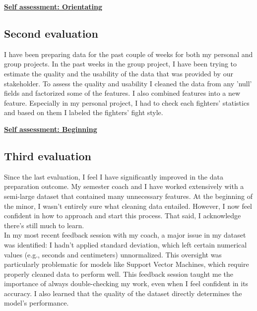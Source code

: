 \documentclass{article}
\begin{document}
	\underline{\textbf{Self assessment: Orientating}}
	
	\subsection{Second evaluation}
	I have been preparing data for the past couple of weeks for both my personal and group projects. In the past weeks in the group project, I have been 
	trying to estimate the quality and the usability of the data that was provided by our stakeholder. To assess the quality and usability I cleaned 
	the data from any 'null' fields and factorized some of the features. I also combined features into a new feature. Especially in my personal 
	project, I had to check each fighters' statistics and based on them I labeled the fighters' fight style.
	
	\underline{\textbf{Self assessment: Beginning}}
	
	\subsection{Third evaluation}
	Since the last evaluation, I feel I have significantly improved in the data preparation outcome. My semester coach and I have worked extensively with a semi-large dataset that contained many unnecessary features. At the beginning of the minor, I wasn’t entirely sure what cleaning data entailed. However, I now feel confident in how to approach and start this process. That said, I acknowledge there’s still much to learn.\\
	
	In my most recent feedback session with my coach, a major issue in my dataset was identified: I hadn’t applied standard deviation, which left certain numerical values (e.g., seconds and centimeters) unnormalized. This oversight was particularly problematic for models like Support Vector Machines, which require properly cleaned data to perform well. This feedback session taught me the importance of always double-checking my work, even when I feel confident in its accuracy. I also learned that the quality of the dataset directly determines the model’s performance.\\
	
\end{document}
